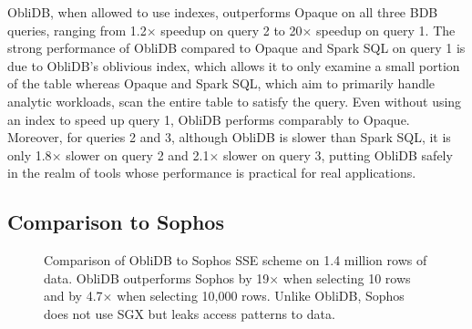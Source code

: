 \documentclass[letterpaper,twocolumn,10pt]{article}
\newcommand{\ignore}[1]{}
\def\name/{ObliDB}
\begin{document}
\name/, when allowed to use indexes, outperforms Opaque on all three BDB queries, ranging from 1.2$\times$ speedup on query 2 to 20$\times$ speedup on query 1. The strong performance of \name/ compared to Opaque and Spark SQL on query 1 is due to \name/'s oblivious index, which allows it to only examine a small portion of the table whereas Opaque and Spark SQL, which aim to primarily handle analytic workloads, scan the entire table to satisfy the query. Even without using an index to speed up query 1, \name/ performs comparably to Opaque. Moreover, for queries 2 and 3, although \name/ is slower than Spark SQL, it is only 1.8$\times$ slower on query 2 and 2.1$\times$ slower on query 3, putting \name/ safely in the realm of tools whose performance is practical for real applications.

\subsection{Comparison to Sophos}
\begin{figure}
\small
\centering
{}
\caption{Comparison of \name/ to Sophos SSE scheme\cite{Bost16} on 1.4 million rows of data. \name/ outperforms Sophos by 19$\times$ when selecting 10 rows and by 4.7$\times$ when selecting 10,000 rows. Unlike \name/, Sophos does not use SGX but leaks access patterns to data.\ignore{make sure to mention in text that sophos numbers come from original paper and were gathered on a much more powerful computer and also used multithreading. Also, if we extrapolate the numbers to 100k rows retrieved, \name/ linear scan actual beats both \name/ index and sophos}}
\label{figSophos}
\end{figure}
\end{document}
